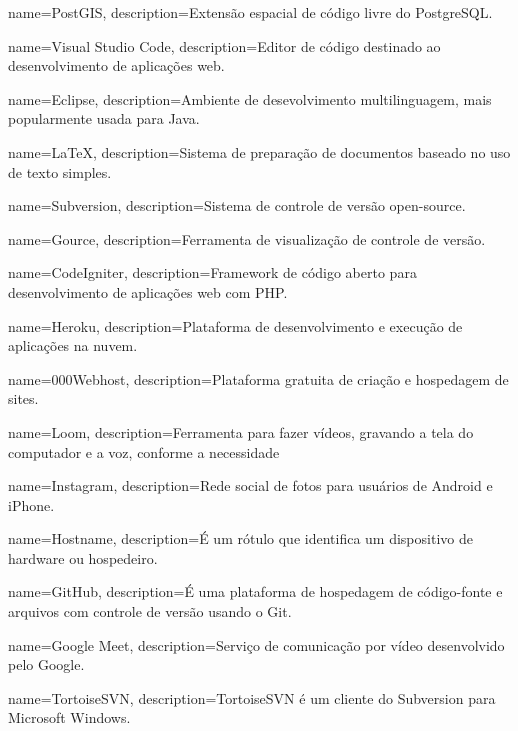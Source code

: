  {
    name=PostGIS,
    description={Extensão espacial de código livre do \gls{PostgreSQL}.}
}

 {
    name=Visual Studio Code,
    description={Editor de código destinado ao desenvolvimento de aplicações web.}
}

 {
    name=Eclipse,
    description={Ambiente de desevolvimento multilinguagem, mais popularmente usada para Java.}
}

 {
    name=\LaTeX,
    description={Sistema de preparação de documentos baseado no uso de texto simples.}
}

 {
    name=Subversion,
    description={Sistema de controle de versão open-source.}
}

 {
    name=Gource,
    description={Ferramenta de visualização de controle de versão.}
}

 {
    name=CodeIgniter,
    description={Framework de código aberto para desenvolvimento de aplicações web com \ac{PHP}.}
}

 {
    name=Heroku,
    description={Plataforma de desenvolvimento e execução de aplicações na nuvem.}
}

 {
    name=000Webhost,
    description={Plataforma gratuita de criação e hospedagem de sites.}
}

 {
    name=Loom,
    description={Ferramenta para fazer vídeos, gravando a tela do computador e a voz, conforme a necessidade}
}

 {
    name=Instagram,
    description={Rede social de fotos para usuários de Android e iPhone.}
}

 {
    name=Hostname,
    description={É um rótulo que identifica um dispositivo de hardware ou hospedeiro.}
}

 {
    name=GitHub,
    description={É uma plataforma de hospedagem de código-fonte e arquivos com controle de versão usando o Git.}
}

 {
    name=Google Meet,
    description={Serviço de comunicação por vídeo desenvolvido pelo Google.}
}

 {
    name=TortoiseSVN,
    description={TortoiseSVN é um cliente do Subversion para Microsoft Windows.}
}

